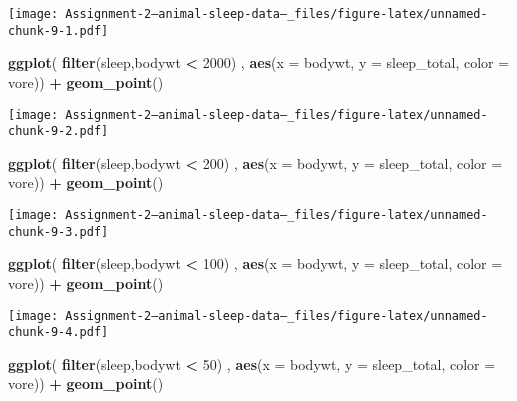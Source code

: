 \documentclass[
]{article}
\newenvironment{Shaded}{\begin{snugshade}}{\end{snugshade}}
\newcommand{\AttributeTok}[1]{\textcolor[rgb]{0.13,0.29,0.53}{#1}}
\newcommand{\DecValTok}[1]{\textcolor[rgb]{0.00,0.00,0.81}{#1}}
\newcommand{\FunctionTok}[1]{\textcolor[rgb]{0.13,0.29,0.53}{\textbf{#1}}}
\newcommand{\NormalTok}[1]{#1}
\newcommand{\SpecialCharTok}[1]{\textcolor[rgb]{0.81,0.36,0.00}{\textbf{#1}}}
\begin{document}
\texttt{[image: Assignment-2---animal-sleep-data--\_files/figure-latex/unnamed-chunk-9-1.pdf]}

\begin{Shaded}
\begin{Highlighting}[]
\FunctionTok{ggplot}\NormalTok{( }\FunctionTok{filter}\NormalTok{(sleep,bodywt }\SpecialCharTok{\textless{}} \DecValTok{2000}\NormalTok{) , }\FunctionTok{aes}\NormalTok{(}\AttributeTok{x =}\NormalTok{ bodywt, }\AttributeTok{y =}\NormalTok{ sleep\_total, }\AttributeTok{color =}\NormalTok{ vore)) }\SpecialCharTok{+} \FunctionTok{geom\_point}\NormalTok{()}
\end{Highlighting}
\end{Shaded}

\texttt{[image: Assignment-2---animal-sleep-data--\_files/figure-latex/unnamed-chunk-9-2.pdf]}

\begin{Shaded}
\begin{Highlighting}[]
\FunctionTok{ggplot}\NormalTok{( }\FunctionTok{filter}\NormalTok{(sleep,bodywt }\SpecialCharTok{\textless{}} \DecValTok{200}\NormalTok{) , }\FunctionTok{aes}\NormalTok{(}\AttributeTok{x =}\NormalTok{ bodywt, }\AttributeTok{y =}\NormalTok{ sleep\_total, }\AttributeTok{color =}\NormalTok{ vore)) }\SpecialCharTok{+} \FunctionTok{geom\_point}\NormalTok{()}
\end{Highlighting}
\end{Shaded}

\texttt{[image: Assignment-2---animal-sleep-data--\_files/figure-latex/unnamed-chunk-9-3.pdf]}

\begin{Shaded}
\begin{Highlighting}[]
\FunctionTok{ggplot}\NormalTok{( }\FunctionTok{filter}\NormalTok{(sleep,bodywt }\SpecialCharTok{\textless{}} \DecValTok{100}\NormalTok{) , }\FunctionTok{aes}\NormalTok{(}\AttributeTok{x =}\NormalTok{ bodywt, }\AttributeTok{y =}\NormalTok{ sleep\_total, }\AttributeTok{color =}\NormalTok{ vore)) }\SpecialCharTok{+} \FunctionTok{geom\_point}\NormalTok{()}
\end{Highlighting}
\end{Shaded}

\texttt{[image: Assignment-2---animal-sleep-data--\_files/figure-latex/unnamed-chunk-9-4.pdf]}

\begin{Shaded}
\begin{Highlighting}[]
\FunctionTok{ggplot}\NormalTok{( }\FunctionTok{filter}\NormalTok{(sleep,bodywt }\SpecialCharTok{\textless{}} \DecValTok{50}\NormalTok{) , }\FunctionTok{aes}\NormalTok{(}\AttributeTok{x =}\NormalTok{ bodywt, }\AttributeTok{y =}\NormalTok{ sleep\_total, }\AttributeTok{color =}\NormalTok{ vore)) }\SpecialCharTok{+} \FunctionTok{geom\_point}\NormalTok{()}
\end{Highlighting}
\end{Shaded}
\end{document}
